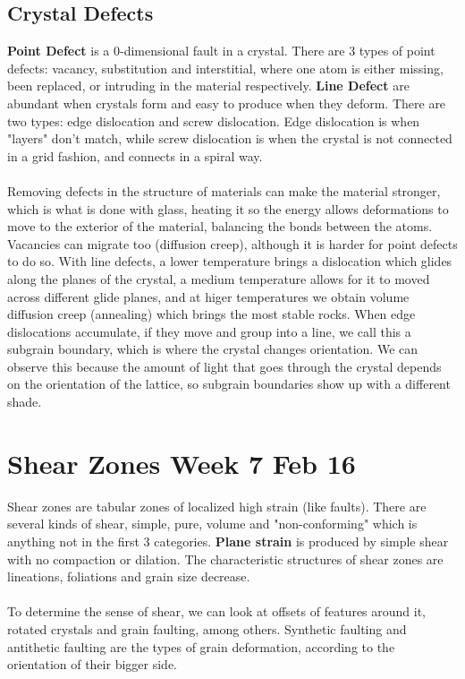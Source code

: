 \documentclass[12pt,a4paper]{report}
\begin{document}
\subsection*{Crystal Defects}
\textbf{Point Defect} is a 0-dimensional fault in a crystal.
There are 3 types of point defects: vacancy, substitution and interstitial, where one atom is either missing, been replaced, or intruding in the material respectively.
\textbf{Line Defect} are abundant when crystals form and easy to produce when they deform.
There are two types: edge dislocation and screw dislocation.
Edge dislocation is when "layers" don't match, while screw dislocation is when the crystal is not connected in a grid fashion, and connects in a spiral way.\\
\\
Removing defects in the structure of materials can make the material stronger, which is what is done with glass, heating it so the energy allows deformations to move to the exterior of the material, balancing the bonds between the atoms.
Vacancies can migrate too (diffusion creep), although it is harder for point defects to do so.
With line defects, a lower temperature brings a dislocation which glides along the planes of the crystal, a medium temperature allows for it to moved across different glide planes, and at higer temperatures we obtain volume diffusion creep (annealing) which brings the most stable rocks.
When edge dislocations accumulate, if they move and group into a line, we call this a subgrain boundary, which is where the crystal changes orientation. We can observe this because the amount of light that goes through the crystal depends on the orientation of the lattice, so subgrain boundaries show up with a different shade.

\section*{Shear Zones Week 7 Feb 16} 
Shear zones are tabular zones of localized high strain (like faults).
There are several kinds of shear, simple, pure, volume and "non-conforming" which is anything not in the first 3 categories.
\textbf{Plane strain} is produced by simple shear with no compaction or dilation.
The characteristic structures of shear zones are lineations, foliations and grain size decrease.\\
\\
To determine the sense of shear, we can look at offsets of features around it, rotated crystals and grain faulting, among others.
Synthetic faulting and antithetic faulting are the types of grain deformation, according to the orientation of their bigger side.
\end{document}
